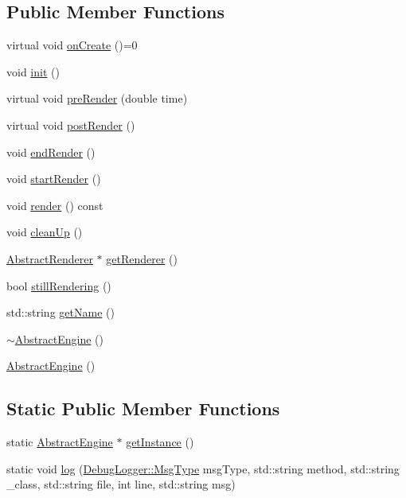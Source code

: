 \subsection*{Public Member Functions}
\begin{DoxyCompactItemize}
\item 
virtual void \hyperlink{class_ori_engine_1_1_abstract_engine_a7359c90344c928e283d177159780646e}{on\+Create} ()=0
\item 
void \hyperlink{class_ori_engine_1_1_abstract_engine_ad969514426afbd6818caea13a538c565}{init} ()
\item 
virtual void \hyperlink{class_ori_engine_1_1_abstract_engine_a132e10c2452afe2d555ac85ea1b48845}{pre\+Render} (double time)
\item 
virtual void \hyperlink{class_ori_engine_1_1_abstract_engine_a12ce6df5383341e36fd674a5e026bf3f}{post\+Render} ()
\item 
void \hyperlink{class_ori_engine_1_1_abstract_engine_a6a9cec01e078695703f9def8e3814dbf}{end\+Render} ()
\item 
void \hyperlink{class_ori_engine_1_1_abstract_engine_ae406e1718ed7da4d0ff074f91bd2d4b7}{start\+Render} ()
\item 
void \hyperlink{class_ori_engine_1_1_abstract_engine_aa88ad7f1c4168f03139f33d467b0a9d0}{render} () const
\item 
void \hyperlink{class_ori_engine_1_1_abstract_engine_a8c77cd4669df9193d5283cf48bee3b94}{clean\+Up} ()
\item 
\hyperlink{class_ori_engine_1_1_abstract_renderer}{Abstract\+Renderer} $\ast$ \hyperlink{class_ori_engine_1_1_abstract_engine_a06eb88e86a88b9dbd392b6a789a3d91e}{get\+Renderer} ()
\item 
bool \hyperlink{class_ori_engine_1_1_abstract_engine_af02f0fa50c8ef658e3ff892aa8d8a264}{still\+Rendering} ()
\item 
std\+::string \hyperlink{class_ori_engine_1_1_abstract_engine_a41b34e146f5b19e40dc3f1cb1343d4d6}{get\+Name} ()
\item 
\hyperlink{class_ori_engine_1_1_abstract_engine_acb8473107540b7ed52eadce12bc69a81}{$\sim$\+Abstract\+Engine} ()
\item 
\hyperlink{class_ori_engine_1_1_abstract_engine_aca590b0d9aa8d7f6b907b2ea575f52d8}{Abstract\+Engine} ()
\end{DoxyCompactItemize}
\subsection*{Static Public Member Functions}
\begin{DoxyCompactItemize}
\item 
static \hyperlink{class_ori_engine_1_1_abstract_engine}{Abstract\+Engine} $\ast$ \hyperlink{class_ori_engine_1_1_abstract_engine_a650375136fb726707d36acbf9f7ed3b8}{get\+Instance} ()
\item 
static void \hyperlink{class_ori_engine_1_1_abstract_engine_a03fcd9fd70108afd53924b0f9d2724a3}{log} (\hyperlink{class_ori_engine_1_1_debug_logger_a3ac0c97517b3aecb4ea7bdb5b98e6fe5}{Debug\+Logger\+::\+Msg\+Type} msg\+Type, std\+::string method, std\+::string \+\_\+class, std\+::string file, int line, std\+::string msg)
\end{DoxyCompactItemize}
